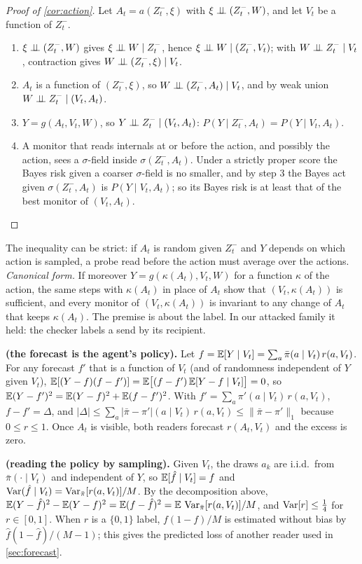 \begin{proof}[Proof of \cref{cor:action}]
Let $A_t=a(Z^-_t,\xi)$ with $\xi\perp\!\!\!\perp(Z^-_t,W)$, and let $V_t$ be a function of $Z^-_t$.
\begin{enumerate}
\item $\xi\perp\!\!\!\perp(Z^-_t,W)$ gives $\xi\perp\!\!\!\perp W\mid Z^-_t$, hence $\xi\perp\!\!\!\perp W\mid (Z^-_t,V_t)$; with $W\perp\!\!\!\perp Z^-_t\mid V_t$, contraction gives $W\perp\!\!\!\perp(Z^-_t,\xi)\mid V_t$.
\item $A_t$ is a function of $(Z^-_t,\xi)$, so $W\perp\!\!\!\perp(Z^-_t,A_t)\mid V_t$, and by weak union $W\perp\!\!\!\perp Z^-_t\mid(V_t,A_t)$.
\item $Y=g(A_t,V_t,W)$, so $Y\perp\!\!\!\perp Z^-_t\mid(V_t,A_t)$: $P(Y\mid Z^-_t,A_t)=P(Y\mid V_t,A_t)$.
\item A monitor that reads internals at or before the action, and possibly the action, sees a $\sigma$-field inside
  $\sigma(Z^-_t,A_t)$. Under a strictly proper score the Bayes risk given a coarser $\sigma$-field is no smaller, and by step 3
  the Bayes act given $\sigma(Z^-_t,A_t)$ is $P(Y\mid V_t,A_t)$; so its Bayes risk is at least that of the best monitor of
  $(V_t,A_t)$.\qedhere
\end{enumerate}
\end{proof}
The inequality can be strict: if $A_t$ is random given $Z^-_t$ and $Y$ depends on which action is sampled, a probe read before
the action must average over the actions. \emph{Canonical form.} If moreover $Y=g(\kappa(A_t),V_t,W)$ for a function $\kappa$ of the
action, the same steps with $\kappa(A_t)$ in place of $A_t$ show that $(V_t,\kappa(A_t))$ is sufficient, and every monitor of
$(V_t,\kappa(A_t))$ is invariant to any change of $A_t$ that keeps $\kappa(A_t)$. The premise is about the label. In our attacked family it held: the checker labels a send by its recipient.


\textbf{ (the forecast is the agent's policy).} Let $f=\mathbb{E}[Y\mid V_t]=\sum_a\bar\pi(a\mid V_t)\,r(a,V_t)$. For any forecast $f'$ that is a function of $V_t$ (and of randomness independent of $Y$ given $V_t$), $\mathbb{E}[(Y-f)(f-f')]=\mathbb{E}\big[(f-f')\,\mathbb{E}[Y-f\mid V_t]\big]=0$, so $\mathbb{E}(Y-f')^2=\mathbb{E}(Y-f)^2+\mathbb{E}(f-f')^2$. With $f'=\sum_a\pi'(a\mid V_t)\,r(a,V_t)$, $f-f'=\Delta$, and $|\Delta|\le\sum_a|\bar\pi-\pi'|(a\mid V_t)\,r(a,V_t)\le\|\bar\pi-\pi'\|_1$ because $0\le r\le1$. Once $A_t$ is visible, both readers forecast $r(A_t,V_t)$ and the excess is zero.

\textbf{ (reading the policy by sampling).} Given $V_t$, the draws $a_k$ are i.i.d.\ from $\bar\pi(\cdot\mid V_t)$ and independent of $Y$, so $\mathbb{E}[\hat f\mid V_t]=f$ and $\operatorname{Var}(\hat f\mid V_t)=\operatorname{Var}_{\bar\pi}[r(a,V_t)]/M$. By the decomposition above, $\mathbb{E}(Y-\hat f)^2-\mathbb{E}(Y-f)^2=\mathbb{E}(f-\hat f)^2=\mathbb{E}\,\operatorname{Var}_{\bar\pi}[r(a,V_t)]/M$, and $\operatorname{Var}[r]\le\frac14$ for $r\in[0,1]$. When $r$ is a $\{0,1\}$ label, $f(1-f)/M$ is estimated without bias by $\hat f(1-\hat f)/(M-1)$; this gives the predicted loss of another reader used in \cref{sec:forecast}.

